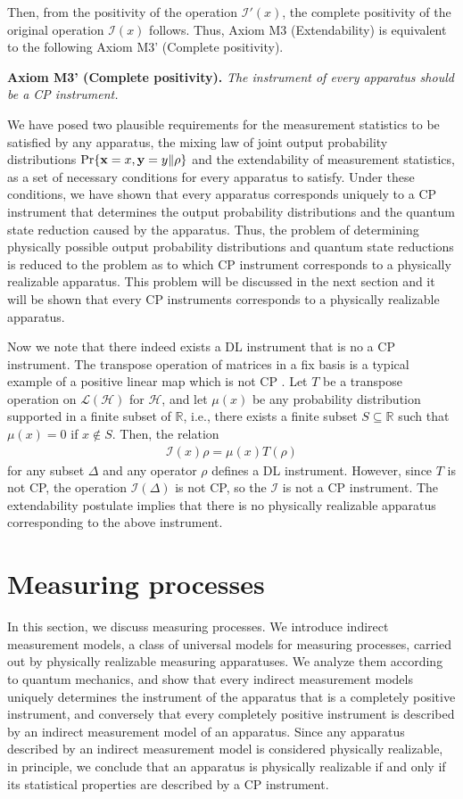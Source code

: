 \documentclass[graybox]{svmult}
\newcommand{\beqa}{\begin{eqnarray}}
\newcommand{\eeqa}{\end{eqnarray}}
\newcommand{\cH}{{\mathcal H}}
\newcommand{\cI}{{\mathcal I}}
\newcommand{\cL}{{\mathcal L}}
\newcommand{\rh}{\rho}
\newcommand{\De}{\Delta}
\newcommand{\bx}{{\bf x}}
\newcommand{\by}{{\bf y}}
\newcommand{\R}{\mathbb{R}}
\begin{document}
 Then, from the positivity of the operation
$\cI'(x)$, the complete positivity of the original operation $\cI(x)$
follows.  Thus, Axiom M3 (Extendability) is equivalent to the following 
Axiom M3' (Complete positivity).
\bigskip

{\bf Axiom M3' (Complete positivity).}
{\em The instrument of every apparatus should be a CP instrument.}
\bigskip

We have posed two plausible requirements for the measurement statistics 
to be satisfied by any apparatus,
the mixing law of joint output probability distributions $\Pr\{\bx=x,\by=y\| \rh\}$ 
and the extendability of measurement statistics, 
as a set of necessary conditions for every apparatus to satisfy. 
Under these conditions, we have shown that every
apparatus corresponds uniquely to a CP instrument
that determines the output probability distributions and
the quantum state reduction caused by the apparatus.
Thus, the problem of determining physically  possible output probability distributions
and quantum state reductions is reduced to the problem as to which
CP instrument corresponds to a physically realizable apparatus.
This problem will be discussed in the next section and it will be shown 
that every CP instruments corresponds to a physically realizable apparatus. 

Now we note that there indeed exists a DL instrument that is no a CP instrument. 
The transpose operation of matrices in a fix basis is 
a typical example of a positive linear map which is not CP \cite{NC00}.
Let $T$ be a transpose operation on $\cL(\cH)$ 
for $\cH$,
and let $\mu(x)$ be any probability distribution supported in a finite subset of $\R$,
i.e., there exists a finite subset $S\subseteq\R$ such that $\mu(x)=0$ if $x\not\in S$.
Then, the relation
\beqa
\cI(x)\rh=\mu(x)T(\rh)
\eeqa
for any subset $\De$ and any operator $\rh$
defines a DL instrument.  
However, since $T$ is not CP, the operation
$\cI(\De)$ is not CP, so the $\cI$ is not a CP instrument.
The extendability postulate implies that there is no physically realizable 
apparatus corresponding to the above instrument.


\section{Measuring processes}
In this section, we discuss measuring processes.
We introduce indirect measurement models, a class of universal models for 
measuring processes, carried out by physically realizable measuring apparatuses.
We analyze them according to quantum mechanics, and show that every 
indirect measurement models uniquely determines the instrument of the apparatus
that is a completely positive instrument, and conversely that every completely 
positive instrument is described by an indirect measurement model of an apparatus. 
Since any apparatus described by an indirect measurement model is considered
physically realizable, in principle, we conclude that an apparatus is physically realizable
if and only if its statistical properties are described by a CP instrument.
\end{document}
